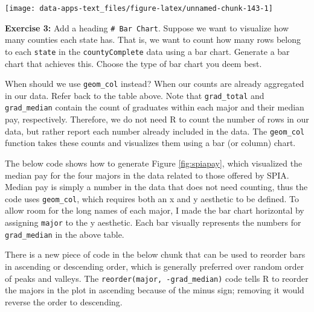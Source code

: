 \documentclass[
]{book}
\newenvironment{rmdblock}[1]
  {\begin{shaded*}
  }
  {\end{shaded*}
  }
\newenvironment{learncheck}
  {\begin{rmdblock}{warning}}
  {\end{rmdblock}}
\begin{document}
\begin{center}\texttt{[image: data-apps-text\_files/figure-latex/unnamed-chunk-143-1]} \end{center}

\begin{learncheck}
\textbf{Exercise 3:} Add a heading \texttt{\#\ Bar\ Chart}. Suppose we
want to visualize how many counties each state has. That is, we want to
count how many rows belong to each \texttt{state} in the
\texttt{countyComplete} data using a bar chart. Generate a bar chart
that achieves this. Choose the type of bar chart you deem best.
\end{learncheck}

When should we use \texttt{geom\_col} instead? When our counts are already aggregated in our data. Refer back to the table above. Note that \texttt{grad\_total} and \texttt{grad\_median} contain the count of graduates within each major and their median pay, respectively. Therefore, we do not need R to count the number of rows in our data, but rather report each number already included in the data. The \texttt{geom\_col} function takes these counts and visualizes them using a bar (or column) chart.

The below code shows how to generate Figure \ref{fig:spiapay}, which visualized the median pay for the four majors in the data related to those offered by SPIA. Median pay is simply a number in the data that does not need counting, thus the code uses \texttt{geom\_col}, which requires both an x and y aesthetic to be defined. To allow room for the long names of each major, I made the bar chart horizontal by assigning \texttt{major} to the y aesthetic. Each bar visually represents the numbers for \texttt{grad\_median} in the above table.

There is a new piece of code in the below chunk that can be used to reorder bars in ascending or descending order, which is generally preferred over random order of peaks and valleys. The \texttt{reorder(major,\ -grad\_median)} code tells R to reorder the majors in the plot in ascending because of the minus sign; removing it would reverse the order to descending.
\end{document}
